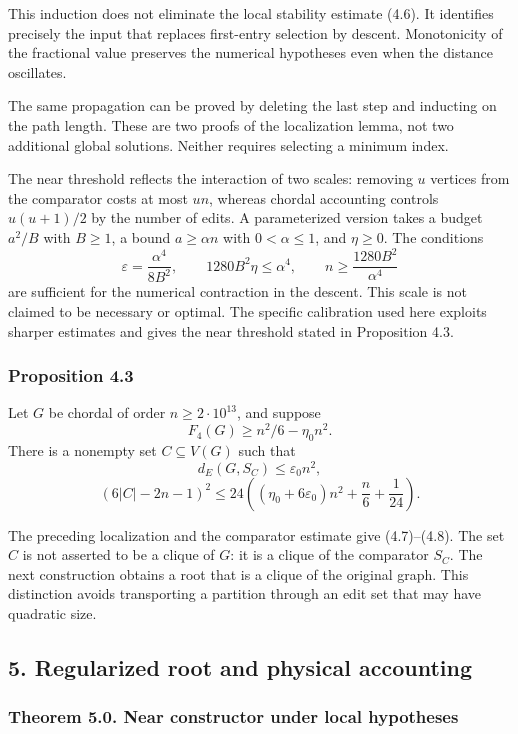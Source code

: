 \documentclass[english,11pt,a4paper]{article}
\newcounter{none}
\begin{document}
This induction does not eliminate the local stability estimate (4.6). It identifies precisely the input that replaces first-entry selection by descent. Monotonicity of the fractional value preserves the numerical hypotheses even when the distance oscillates.

The same propagation can be proved by deleting the last step and inducting on the path length. These are two proofs of the localization lemma, not two additional global solutions. Neither requires selecting a minimum index.

The near threshold reflects the interaction of two scales: removing \(u\) vertices from the comparator costs at most \(un\), whereas chordal accounting controls \(u(u+1)/2\) by the number of edits. A parameterized version takes a budget \(a^2/B\) with \(B\ge1\), a bound \(a\ge\alpha n\) with \(0<\alpha\le1\), and \(\eta\ge0\). The conditions \[
\varepsilon=\frac{\alpha^4}{8B^2},\qquad
1280B^2\eta\le\alpha^4,\qquad
n\ge\frac{1280B^2}{\alpha^4}
\] are sufficient for the numerical contraction in the descent. This scale is not claimed to be necessary or optimal. The specific calibration used here exploits sharper estimates and gives the near threshold stated in Proposition 4.3.

\subsubsection{Proposition 4.3}\label{proposition-4.3}

Let \(G\) be chordal of order \(n\ge2\cdot10^{13}\), and suppose \[
F_4(G)\ge n^2/6-\eta_0n^2.
\] There is a nonempty set \(C\subseteq V(G)\) such that \[
d_E(G,S_C)\le\varepsilon_0n^2,
\tag{4.7}
\] \[
(6|C|-2n-1)^2
\le24\left((\eta_0+6\varepsilon_0)n^2+\frac n6+\frac1{24}\right).
\tag{4.8}
\]

The preceding localization and the comparator estimate give (4.7)--(4.8). The set \(C\) is not asserted to be a clique of \(G\): it is a clique of the comparator \(S_C\). The next construction obtains a root that is a clique of the original graph. This distinction avoids transporting a partition through an edit set that may have quadratic size.

\subsection{5. Regularized root and physical accounting}\label{regularized-root-and-physical-accounting}

\subsubsection{Theorem 5.0. Near constructor under local hypotheses}\label{theorem-5.0.-near-constructor-under-local-hypotheses}
\end{document}

